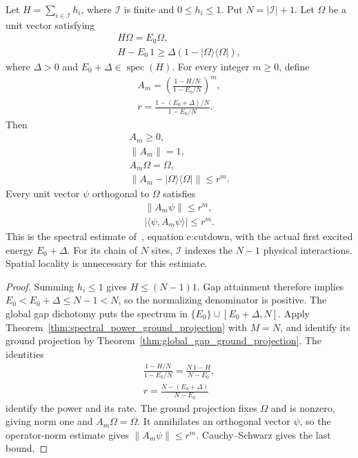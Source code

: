 \begin{theorem}
    \label{thm:physical_power_filter}
    \leanok
    Let $H=\sum_{i\in\mathcal I}h_i$, where $\mathcal I$ is finite and
    $0\le h_i\le1$. Put $N=|\mathcal I|+1$.
    Let $\Omega$ be a unit vector satisfying
    \begin{align*}
        H\Omega=E_0\Omega, \\
        H-E_0\,1\ge\Delta(1-|\Omega\rangle\langle\Omega|),
    \end{align*}
    where $\Delta>0$ and $E_0+\Delta\in\operatorname{spec}(H)$.
    For every integer $m\ge0$, define
    \begin{align*}
        A_m=\left(\frac{1-H/N}{1-E_0/N}\right)^m, \\
        r=\frac{1-(E_0+\Delta)/N}{1-E_0/N}.
    \end{align*}
    Then
    \begin{align*}
        A_m\ge0, \\
        \|A_m\|=1, \\
        A_m\Omega=\Omega, \\
        \|A_m-|\Omega\rangle\langle\Omega|\|\le r^m.
    \end{align*}
    Every unit vector $\psi$ orthogonal to $\Omega$ satisfies
    \begin{align*}
        \|A_m\psi\|\le r^m, \\
        |\langle\psi,A_m\psi\rangle|\le r^m.
    \end{align*}
    This is the spectral estimate of~\cite{Landau2013PolynomialTime},
    equation e:cutdown, with the actual first excited energy $E_0+\Delta$.
    For its chain of $N$ sites, $\mathcal I$ indexes the $N-1$ physical
    interactions. Spatial locality is unnecessary for this estimate.
\end{theorem}

\begin{proof}
    \leanok
    Summing $h_i\le1$ gives $H\le(N-1)1$. Gap attainment therefore implies
    $E_0<E_0+\Delta\le N-1<N$, so the normalizing denominator is positive.
    The global gap dichotomy puts the spectrum in
    $\{E_0\}\cup[E_0+\Delta,N]$.
    Apply Theorem~\ref{thm:spectral_power_ground_projection} with $M=N$,
    and identify its ground projection by
    Theorem~\ref{thm:global_gap_ground_projection}.
    The identities
    \begin{align*}
        \frac{1-H/N}{1-E_0/N}=\frac{N\,1-H}{N-E_0}, \\
        r=\frac{N-(E_0+\Delta)}{N-E_0}
    \end{align*}
    identify the power and its rate. The ground projection fixes $\Omega$
    and is nonzero, giving norm one and $A_m\Omega=\Omega$.
    It annihilates an orthogonal vector $\psi$, so the operator-norm
    estimate gives $\|A_m\psi\|\le r^m$. Cauchy--Schwarz gives the last bound.
\end{proof}

